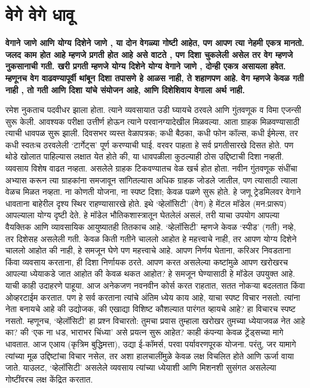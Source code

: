 \chapter{वेगे वेगे धावू }

\textcolor{blue!60!black}{\textbf{वेगाने जाणे आणि योग्य दिशेने जाणे , या दोन वेगळ्या गोष्टी आहेत, पण आपण त्या नेहमी एकत्र मानतो. जलद काम होत आहे म्हणजे प्रगती होत आहे असे वाटते , पण दिशा चुकलेली असेल तर वेग म्हणजे नुकसानाची गती. खरी प्रगती म्हणजे योग्य दिशेने योग्य वेगाने जाणे , दोन्ही एकत्र असायला हवेत. म्हणूनच वेग वाढवण्यापूर्वी थांबून दिशा तपासणे हे आळस नाही, ते शहाणपण आहे. वेग म्हणजे केवळ गती नाही , तो गती आणि दिशा यांचे संयोजन आहे, आणि दिशेशिवाय वेगाला अर्थ नाही.}}

रमेश नुकताच पदवीधर झाला होता. त्याने व्यवसायात उडी घ्यायचे ठरवले आणि गुंतवणूक व विमा एजन्सी सुरू केली. आवश्यक परीक्षा उत्तीर्ण होऊन त्याने परवानग्यादेखील मिळवल्या. आता ग्राहक मिळवण्यासाठी त्याची धावपळ सुरू झाली. दिवसभर व्यस्त वेळापत्रक; कधी बैठका, कधी फोन कॉल्स, कधी ईमेल्स, तर कधी स्वतःच ठरवलेली ‘टार्गेट्स’ पूर्ण करण्याची घाई. वरवर पाहता हे सर्व प्रगतीसारखे दिसत होते. पण थोडे खोलात पाहिल्यास लक्षात येत होते की, या धावपळीला कुठल्याही ठोस उद्दिष्टाची दिशा नव्हती. व्यवसाय विशेष वाढत नव्हता. असलेले ग्राहक टिकवण्यातच वेळ खर्च होत होता. नवीन गुंतवणूक संधींचा अभ्यास करून त्या ग्राहकांना समजावून सांगितल्यास अधिक ग्राहक जोडले जातील, पण त्यासाठी त्याला वेळच मिळत नव्हता. ना कोणती योजना, ना स्पष्ट दिशा; केवळ पळणे सुरू होते. हे जणू ट्रेडमिलवर वेगाने धावताना बाहेरील दृश्य स्थिर राहण्यासारखे होते.
इथे ‘व्हेलॉसिटी’ (वेग) हे मेंटल मॉडेल (मन:प्रारूप) आपल्याला योग्य दृष्टी देते. हे मॉडेल भौतिकशास्त्रातून घेतलेलं असलं, तरी याचा उपयोग आपल्या वैयक्तिक आणि व्यावसायिक आयुष्यातही तितकाच आहे. ‘व्हेलॉसिटी’ म्हणजे केवळ ‘स्पीड’ (गती) नव्हे, तर दिशेसह असलेली गती. केवळ किती गतीने चाललो आहोत हे महत्त्वाचे नाही, तर आपण योग्य दिशेने चाललो आहोत की नाही, हे समजून घेणे पण महत्त्वाचे आहे. आपण निर्णय घेताना, करिअर निवडताना किंवा व्यवसाय करताना, ही दिशा निर्णायक ठरते. आपण करत असलेल्या कष्टांमुळे आपण खरोखरच आपल्या ध्येयाकडे जात आहोत की केवळ थकत आहोत? हे समजून घेण्यासाठी हे मॉडेल उपयुक्त आहे. याची काही उदाहरणे पाहूया.
आज अनेकजण नवनवीन कोर्स करत राहतात, सतत नोकऱ्या बदलतात किंवा ओव्हरटाईम करतात. पण हे सर्व करताना त्यांचे अंतिम ध्येय काय आहे, याचा स्पष्ट विचार नसतो. त्यांना नेता बनायचे आहे की उद्योजक, की एखाद्या विशिष्ट कौशल्यात पारंगत व्हायचे आहे? हा विचारच स्पष्ट नसतो. म्हणूनच, ‘व्हेलॉसिटी’ हा प्रश्न विचारतो: तुमचा प्रवास तुम्हाला खरोखर तुमच्या ध्येयाजवळ नेत आहे का? की ‘एक ना धड, भाराभर चिंध्या’ असे प्रयत्न सुरू आहेत?
काही कंपन्या केवळ ट्रेंड्सच्या मागे धावतात. आज एआय (कृत्रिम बुद्धिमत्ता), उद्या ई-कॉमर्स, परवा पर्यावरणपूरक योजना. परंतु, जर यामागे त्यांच्या मूळ उद्दिष्टांचा विचार नसेल, तर अशा हालचालींमुळे केवळ लक्ष विचलित होते आणि ऊर्जा वाया जाते. याउलट, ‘व्हेलॉसिटी’ असलेले व्यवसाय त्यांच्या ध्येयाशी आणि मिशनशी सुसंगत असलेल्या गोष्टींवरच लक्ष केंद्रित करतात.
